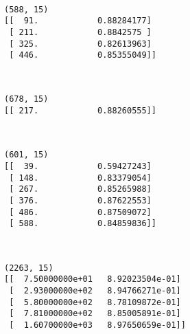 \documentclass{article}
\begin{document}
    \begin{center}
    \end{center}
    { \hspace*{\fill} \\}
    
    \begin{Verbatim}[commandchars=\\\{\}]
(588, 15)
[[  91.            0.88284177]
 [ 211.            0.8842575 ]
 [ 325.            0.82613963]
 [ 446.            0.85355049]]
    \end{Verbatim}

    \begin{center}
    \end{center}
    { \hspace*{\fill} \\}
    
    \begin{Verbatim}[commandchars=\\\{\}]
(678, 15)
[[ 217.            0.88260555]]
    \end{Verbatim}

    \begin{center}
    \end{center}
    { \hspace*{\fill} \\}
    
    \begin{Verbatim}[commandchars=\\\{\}]
(601, 15)
[[  39.            0.59427243]
 [ 148.            0.83379054]
 [ 267.            0.85265988]
 [ 376.            0.87622553]
 [ 486.            0.87509072]
 [ 588.            0.84859836]]
    \end{Verbatim}

    \begin{center}
    \end{center}
    { \hspace*{\fill} \\}
    
    \begin{Verbatim}[commandchars=\\\{\}]
(2263, 15)
[[  7.50000000e+01   8.92023504e-01]
 [  2.93000000e+02   8.94766271e-01]
 [  5.80000000e+02   8.78109872e-01]
 [  7.81000000e+02   8.85005891e-01]
 [  1.60700000e+03   8.97650659e-01]]
    \end{Verbatim}
\end{document}
